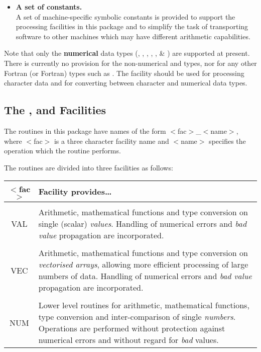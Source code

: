 \begin{itemize}
\item {\bf A set of constants.}\\
A set of machine-specific symbolic constants is provided to support the
processing facilities in this package and to simplify the task of
transporting software to other machines which may have different arithmetic 
capabilities.

\end{itemize}

Note that only the {\bf numerical}  data types (,
, , , ,
 \& ) are supported at present. 
There is currently no provision for the non-numerical  and
 types, nor for any other Fortran (or  Fortran) types
such as . 
The  facility should be used for processing character data and for
converting between character and numerical data types. 

\subsection{The ,  and  Facilities}

The routines in this package have names of the form
\mbox{$<$fac$>$\_$<$name$>$}, where \mbox{$<$fac$>$} is a three character
facility name and \mbox{$<$name$>$} specifies the operation which the
routine performs. 

The routines are divided into three facilities as follows: 

\begin{center}
\begin{tabular}{c|p{33em}}

{\bf $<$fac$>$} & {\bf Facility provides\ldots } \\
\hline
\\
VAL & Arithmetic, mathematical functions and type conversion on single 
(scalar) {\em values}.
Handling of numerical errors and {\em bad value} propagation are
incorporated.\\ 
\\ 
VEC & Arithmetic, mathematical functions and type conversion on {\em
vectorised arrays}, allowing more efficient processing of large numbers of
data. 
Handling of numerical errors and {\em bad value} propagation are
incorporated.\\ 
\\
NUM & Lower level routines for arithmetic, mathematical functions, type
conversion and inter-comparison of single {\em numbers}. 
Operations are performed without protection against numerical errors and
without regard for {\em bad} values.
\\ 
\end{tabular}
\end{center}

